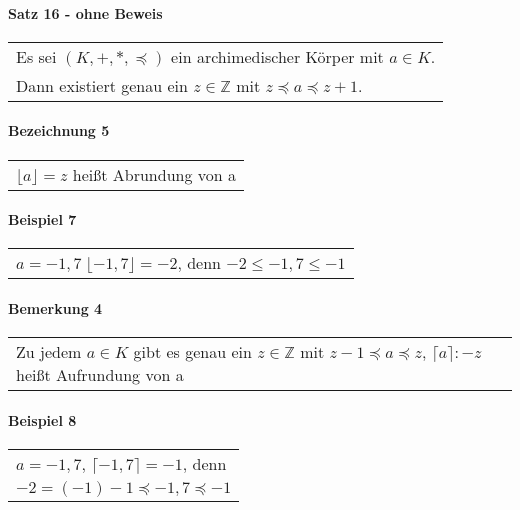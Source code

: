 \documentclass[a4paper]{scrartcl}
\begin{document}
\paragraph{Satz 16 - ohne Beweis}
\begin{tabbing}
\begin{tabular}{l}
Es sei $(K,+,*,\preceq)$ ein archimedischer Körper mit $a\in K$.\\
Dann existiert genau ein $z\in\mathbb{Z}$ mit $z\preceq a \preceq z+1$.
\end{tabular}
\end{tabbing}

\paragraph{Bezeichnung 5}
\begin{tabbing}
\begin{tabular}{l}
$\lfloor a\rfloor = z$ heißt Abrundung von a
\end{tabular}
\end{tabbing}

\paragraph{Beispiel 7}
\begin{tabbing}
\begin{tabular}{l}
$a= -1,7\; \lfloor -1,7\rfloor = -2$, denn $-2 \leq -1,7 \leq -1$
\end{tabular}
\end{tabbing}

\paragraph{Bemerkung 4}
\begin{tabbing}
\begin{tabular}{l}
Zu jedem $a\in K$ gibt es genau ein $z\in\mathbb{Z}$ mit 
$z-1\preceq a \preceq z$, $\lceil a\rceil :- z$ heißt Aufrundung von a
\end{tabular}
\end{tabbing}

\paragraph{Beispiel 8}
\begin{tabbing}
\begin{tabular}{l}
$a = -1,7$, $\lceil -1,7\rceil = -1$, denn\\
$-2 = (-1)-1 \preceq -1,7 \preceq -1$
\end{tabular}
\end{tabbing}
\end{document}
